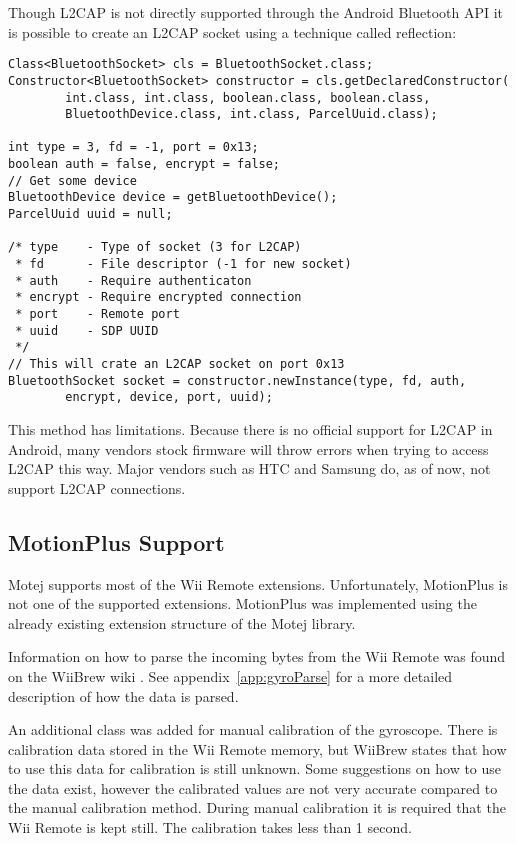 Though L2CAP is not directly supported through the Android Bluetooth API it is possible to create an L2CAP socket using a technique called reflection:
\begin{lstlisting}
Class<BluetoothSocket> cls = BluetoothSocket.class;
Constructor<BluetoothSocket> constructor = cls.getDeclaredConstructor(
		int.class, int.class, boolean.class, boolean.class,
		BluetoothDevice.class, int.class, ParcelUuid.class);

int type = 3, fd = -1, port = 0x13;
boolean auth = false, encrypt = false;
// Get some device
BluetoothDevice device = getBluetoothDevice();
ParcelUuid uuid = null;

/* type    - Type of socket (3 for L2CAP)
 * fd      - File descriptor (-1 for new socket)
 * auth    - Require authenticaton
 * encrypt - Require encrypted connection
 * port    - Remote port
 * uuid	   - SDP UUID
 */
// This will crate an L2CAP socket on port 0x13
BluetoothSocket socket = constructor.newInstance(type, fd, auth,
		encrypt, device, port, uuid);
\end{lstlisting}

This method has limitations. Because there is no official support for L2CAP in Android, many vendors stock firmware will throw errors when trying to access L2CAP this way. Major vendors such as HTC and Samsung do, as of now, not support L2CAP connections.

\subsection{MotionPlus Support}
Motej supports most of the Wii Remote extensions. Unfortunately, MotionPlus is not one of the supported extensions. MotionPlus was implemented using the already existing extension structure of the Motej library.

Information on how to parse the incoming bytes from the Wii Remote was found on the WiiBrew wiki \cite{wiiBrew}. See appendix~\ref{app:gyroParse} for a more detailed description of how the data is parsed. 

An additional class was added for manual calibration of the gyroscope. There is calibration data stored in the Wii Remote memory, but WiiBrew states that how to use this data for calibration is still unknown. Some suggestions on how to use the data exist, however the calibrated values are not very accurate compared to the manual calibration method. During manual calibration it is required that the Wii Remote is kept still. The calibration takes less than 1 second.

